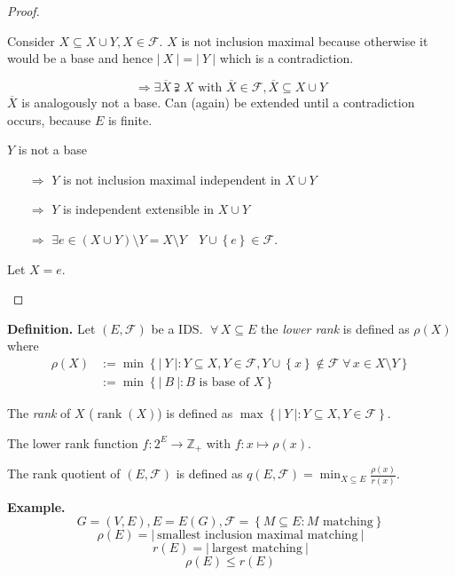 \documentclass[a4paper]{article}
\theoremstyle{definition}
\newcommand{\card}[1]{\left|\:\!#1\:\!\right|}
\newcommand{\set}[1]{\left\{#1\right\}}
\newcommand{\fall}{\;\forall\,}
\DeclareMathOperator{\rank}{rank}
\begin{document}
\begin{proof}
\begin{itemize}
    Consider $X \subseteq X \cup Y, X \in \mathcal{F}$. $X$ is not inclusion maximal because otherwise it would be a base and hence $\card{X} = \card{Y}$ which is a contradiction.

    \[
      \Rightarrow \exists \overline{X} \supsetneqq X \text{ with } \overline{X} \in \mathcal{F}, \overline{X} \subseteq X \cup Y
    \]
    $\overline{X}$ is analogously not a base. Can (again) be extended until a contradiction occurs, because $E$ is finite.

    $Y$ is not a base
    \begin{itemize}
      \item[$\Rightarrow$] $Y$ is not inclusion maximal independent in $X \cup Y$
      \item[$\Rightarrow$] $Y$ is independent extensible in $X \cup Y$
      \item[$\Rightarrow$] $\exists e \in (X \cup Y) \setminus Y = X \setminus Y \quad Y \cup \set{e} \in \mathcal{F}$.
    \end{itemize}
    Let $X = e$.
  \end{itemize}
\end{proof}

\textbf{Definition.}
  Let $(E, \mathcal{F})$ be a IDS. $\fall X \subseteq E$ the \emph{lower rank} is defined as $\rho(X)$ where
  \begin{align*}
      \rho(X)
        &:= \min\set{\card{Y}: Y \subseteq X,
          Y \in \mathcal{F},
          Y \cup \set{x} \notin \mathcal{F}
          \fall x \in X \setminus Y
        } \\
        & := \min\set{\card{B}: B \text{ is base of } X}
  \end{align*}

  The \emph{rank} of $X$ ($\rank(X)$) is defined as $\max\set{\card{Y}: Y \subseteq X, Y \in \mathcal{F}}$.

  The lower rank function $f: 2^E \rightarrow \mathbb{Z}_+$ with $f: x \mapsto \rho(x)$.

  The rank quotient of $(E, \mathcal{F})$ is defined as $q(E, \mathcal{F}) = \min_{X \subseteq E} \frac{\rho(x)}{r(x)}$.

\textbf{Example.}
  \[ G = (V, E), E = E(G), \mathcal{F} = \set{M \subseteq E: M \text{ matching}} \]
  \[ \rho(E) = \card{\text{smallest inclusion maximal matching}} \]
  \[ r(E) = \card{\text{largest matching}} \]
  \[ \rho(E) \leq r(E) \]
\end{document}
